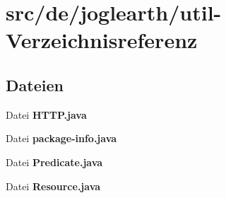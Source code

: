 \section{src/de/joglearth/util-\/\-Verzeichnisreferenz}
\label{dir_559efb8211fc25ef952e33b8adb32e3b}
\subsection*{Dateien}
\begin{DoxyCompactItemize}
\item 
Datei {\bfseries H\-T\-T\-P.\-java}
\item 
Datei {\bfseries package-\/info.\-java}
\item 
Datei {\bfseries Predicate.\-java}
\item 
Datei {\bfseries Resource.\-java}
\end{DoxyCompactItemize}
